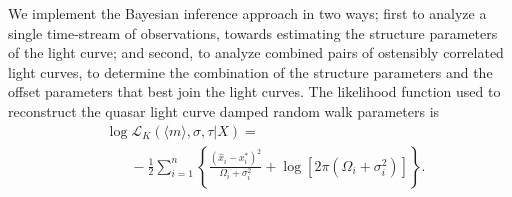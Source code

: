 \documentclass{emulateapj}
\begin{document}
We implement the Bayesian inference approach in two ways; first to analyze a single time-stream
of observations, towards estimating the structure parameters of the
light curve; and second, to analyze combined pairs of ostensibly
correlated light curves, to determine the combination of the structure
parameters and the offset parameters that best join the light
curves. The likelihood function used to reconstruct the quasar light
curve damped random walk parameters is
\begin{align} 
& \log\mathcal{L}_{K}(\langle m\rangle, \sigma,\tau | X) =\nonumber \\
& \ \ \ \ \ \ \ \ -\frac{1}{2}\sum_{i=1}^{n}\left\{
\frac{\left(\hat{x}_i-x^{*}_i\right)^2}{\Omega_i+\sigma_i^2} 
+ 
\log\left[2\pi\left(\Omega_i+\sigma_i^2\right)\right]
\right\}. 
\end{align}
\end{document}
